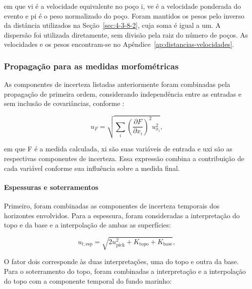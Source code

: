 \noindent
em que vi é a velocidade equivalente no poço i, ve é a velocidade ponderada do evento e pi é o peso normalizado do poço. Foram mantidos os pesos pelo inverso da distância utilizados na Seção~\ref{sec:4-3-8-2}, cuja soma é igual a um. A dispersão foi utilizada diretamente, sem divisão pela raiz do número de poços. As velocidades e os pesos encontram-se no Apêndice~\ref{ap:distancias-velocidades}.

\subsubsection{Propagação para as medidas morfométricas}\label{sec:4-3-9-2}

As componentes de incerteza listadas anteriormente foram combinadas pela propagação de primeira ordem, considerando independência entre as entradas e sem inclusão de covariâncias, conforme :

\begin{equation}
  u_F=\sqrt{\sum_i\left(\frac{\partial F}{\partial x_i}\right)^2u_{x_i}^2},
  \label{eq:propagacao-geral}
\end{equation}

\noindent
em que F é a medida calculada, xi são suas variáveis de entrada e uxi são as respectivas componentes de incerteza. Essa expressão combina a contribuição de cada variável conforme sua influência sobre a medida final.

\paragraph{Espessuras e soterramentos}

Primeiro, foram combinadas as componentes de incerteza temporais dos horizontes envolvidos. Para a espessura, foram consideradas a interpretação do topo e da base e a interpolação de ambas as superfícies:

\begin{equation}
  u_{t,\mathrm{esp}}=\sqrt{2u_{\mathrm{pick}}^2+K_{\mathrm{topo}}+K_{\mathrm{base}}},
  \label{eq:incerteza-temporal-espessura}
\end{equation}

\noindent
O fator dois corresponde às duas interpretações, uma do topo e outra da base. Para o soterramento do topo, foram combinadas a interpretação e a interpolação do topo com a componente temporal do fundo marinho:

